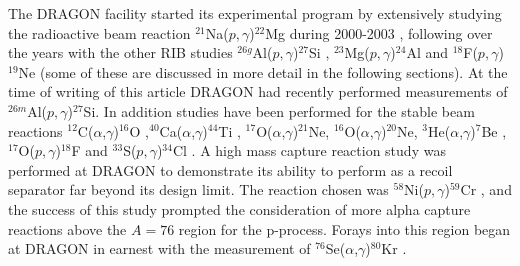 The DRAGON facility started its experimental program by extensively studying the radioactive beam reaction $^{21}$Na($p,\gamma$)$^{22}$Mg during 2000-2003 \cite{dau04}, following over the years with the other RIB studies  $^{26g}$Al($p,\gamma$)$^{27}$Si \cite{rui06}, $^{23}$Mg($p,\gamma$)$^{24}$Al \cite{eri10} and $^{18}$F($p,\gamma$)$^{19}$Ne (some of these are discussed in more detail in the following sections). At the time of writing of this article DRAGON had recently performed measurements of $^{26m}$Al($p,\gamma$)$^{27}$Si. In addition studies have been performed for the stable beam reactions $^{12}$C($\alpha$,$\gamma$)$^{16}$O \cite{mat06},$^{40}$Ca($\alpha$,$\gamma$)$^{44}$Ti \cite{voc07,voc08}, $^{17}$O($\alpha$,$\gamma$)$^{21}$Ne, $^{16}$O($\alpha$,$\gamma$)$^{20}$Ne, $^{3}$He($\alpha$,$\gamma$)$^{7}$Be \cite{sin12}, $^{17}$O($p,\gamma$)$^{18}$F \cite{hag12} and $^{33}$S($p,\gamma$)$^{34}$Cl \cite{fal13}. A high mass capture reaction study was performed at DRAGON to demonstrate its ability to perform as a recoil separator far beyond its design limit. The reaction chosen was $^{58}$Ni($p,\gamma$)$^{59}$Cr \cite{Sim13}, and the success of this study prompted the consideration of more alpha capture reactions above the $A=76$ region for the p-process.  Forays into this region began at DRAGON in earnest with the measurement of $^{76}$Se($\alpha$,$\gamma$)$^{80}$Kr \cite{Fal14}. 




 
